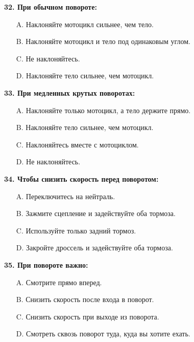 \begin{minipage}{\linewidth}
\vspace{1em}\noindent\textbf{32. При обычном повороте:}

\begin{itemize}[nosep,leftmargin=2em]
\item [A.] Наклоняйте мотоцикл сильнее, чем тело.
\item [B.] Наклоняйте мотоцикл и тело под одинаковым углом.
\item [C.] Не наклоняйтесь.
\item [D.] Наклоняйте тело сильнее, чем мотоцикл.

\end{itemize}
\end{minipage}


\begin{minipage}{\linewidth}
\vspace{1em}\noindent\textbf{33. При медленных крутых поворотах:}

\begin{itemize}[nosep,leftmargin=2em]
\item [A.] Наклоняйте только мотоцикл, а тело держите прямо.
\item [B.] Наклоняйте тело сильнее, чем мотоцикл.
\item [C.] Наклоняйтесь вместе с мотоциклом.
\item [D.] Не наклоняйтесь.

\end{itemize}
\end{minipage}


\begin{minipage}{\linewidth}
\vspace{1em}\noindent\textbf{34. Чтобы снизить скорость перед поворотом:}

\begin{itemize}[nosep,leftmargin=2em]
\item [A.] Переключитесь на нейтраль.
\item [B.] Зажмите сцепление и задействуйте оба тормоза.
\item [C.] Используйте только задний тормоз.
\item [D.] Закройте дроссель и задействуйте оба тормоза.

\end{itemize}
\end{minipage}


\begin{minipage}{\linewidth}
\vspace{1em}\noindent\textbf{35. При повороте важно:}

\begin{itemize}[nosep,leftmargin=2em]
\item [A.] Смотрите прямо вперед.
\item [B.] Снизить скорость после входа в поворот.
\item [C.] Снизить скорость при выходе из поворота.
\item [D.] Смотреть сквозь поворот туда, куда вы хотите ехать.

\end{itemize}
\end{minipage}


